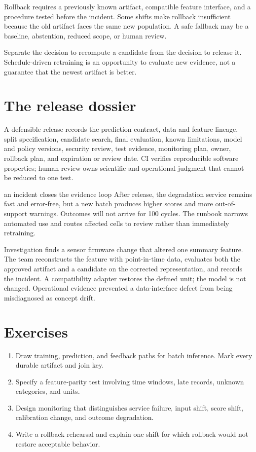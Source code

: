 Rollback requires a previously known artifact, compatible feature interface,
and a procedure tested before the incident. Some shifts make rollback
insufficient because the old artifact faces the same new population. A safe
fallback may be a baseline, abstention, reduced scope, or human review.

\begin{professionalbox}
Separate the decision to recompute a candidate from the decision to release it.
Schedule-driven retraining is an opportunity to evaluate new evidence, not a
guarantee that the newest artifact is better.
\end{professionalbox}

\section{The release dossier}

A defensible release records the prediction contract, data and feature lineage,
split specification, candidate search, final evaluation, known limitations,
model and policy versions, security review, test evidence, monitoring plan,
owner, rollback plan, and expiration or review date. CI verifies reproducible
software properties; human review owns scientific and operational judgment that
cannot be reduced to one test.

\begin{workedexample}{an incident closes the evidence loop}
After release, the degradation service remains fast and error-free, but a new
batch produces higher scores and more out-of-support warnings. Outcomes will not
arrive for 100 cycles. The runbook narrows automated use and routes affected
cells to review rather than immediately retraining.

Investigation finds a sensor firmware change that altered one summary feature.
The team reconstructs the feature with point-in-time data, evaluates both the
approved artifact and a candidate on the corrected representation, and records
the incident. A compatibility adapter restores the defined unit; the model is
not changed. Operational evidence prevented a data-interface defect from being
misdiagnosed as concept drift.
\end{workedexample}

\section{Exercises}
\begin{enumerate}
  \item Draw training, prediction, and feedback paths for batch inference. Mark
  every durable artifact and join key.
  \item Specify a feature-parity test involving time windows, late records,
  unknown categories, and units.
  \item Design monitoring that distinguishes service failure, input shift, score
  shift, calibration change, and outcome degradation.
  \item Write a rollback rehearsal and explain one shift for which rollback
  would not restore acceptable behavior.
\end{enumerate}

